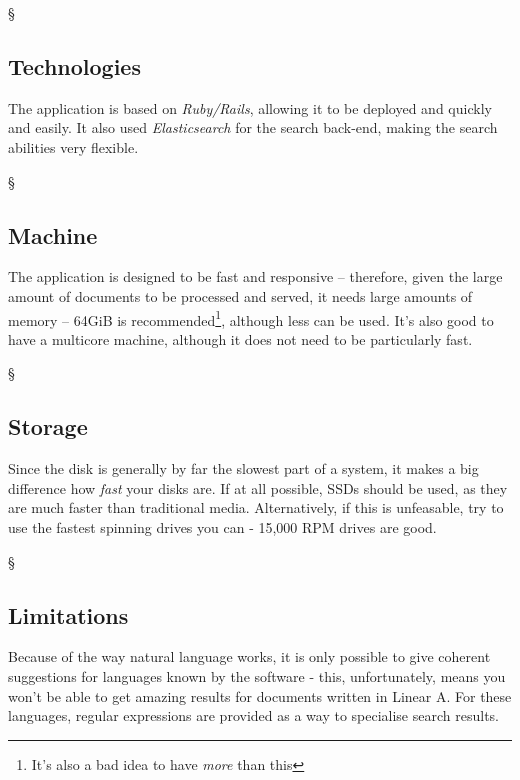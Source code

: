 \documentclass[12pt,a4paper]{report}
\newcommand{\newsection}[1]{\begin{center}\bigskip\S\\\bigskip\end{center}\begin{flushright}\section*{#1}\end{flushright}}
\begin{document}
    \newsection{Technologies}
    
    The application is based on \emph{Ruby/Rails}, allowing it to be deployed and quickly and easily. It also used \emph{Elasticsearch} for the search back-end, making the search abilities very flexible.
    
    \newsection{Machine}
    
    The application is designed to be fast and responsive – therefore, given the large amount of documents to be processed and served, it needs large amounts of memory – 64GiB is recommended\footnote{It's also a bad idea to have \emph{more} than this}, although less can be used. It's also good to have a multicore machine, although it does not need to be particularly fast.
    
    \newsection{Storage}
    Since the disk is generally by far the slowest part of a system, it makes a big difference how \emph{fast} your disks are. If at all possible, SSDs should be used, as they are much faster than traditional media. Alternatively, if this is unfeasable, try to use the fastest spinning drives you can - 15,000 RPM drives are good.
    
    \newsection{Limitations}
    Because of the way natural language works, it is only possible to give coherent suggestions for languages known by the software - this, unfortunately, means you won't be able to get amazing results for documents written in Linear A. For these languages, regular expressions are provided as a way to specialise search results.
\end{document}
